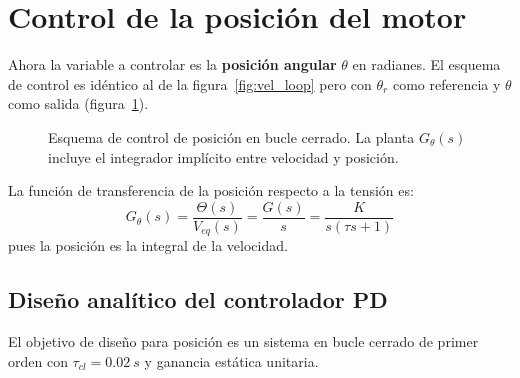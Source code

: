 \documentclass[12pt,a4paper]{article}
\begin{document}
\section{Control de la posición del motor}

Ahora la variable a controlar es la \textbf{posición angular} $\theta$ en radianes.
El esquema de control es idéntico al de la figura~\ref{fig:vel_loop} pero con
$\theta_r$ como referencia y $\theta$ como salida (figura~\ref{fig:pos_loop}).

\begin{figure}[H]
\centering
{}
\caption{Esquema de control de posición en bucle cerrado.
La planta $G_\theta(s)$ incluye el integrador implícito entre velocidad y posición.}
\label{fig:pos_loop}
\end{figure}

La función de transferencia de la posición respecto a la tensión es:
\begin{equation}
  G_\theta(s) = \frac{\Theta(s)}{V_{eq}(s)} = \frac{G(s)}{s} = \frac{K}{s(\tau s+1)}
\end{equation}
pues la posición es la integral de la velocidad.

\subsection{Diseño analítico del controlador PD}

El objetivo de diseño para posición es un sistema en bucle cerrado de primer orden
con $\tau_{cl}=\SI{0.02}{s}$ y ganancia estática unitaria.
\end{document}
